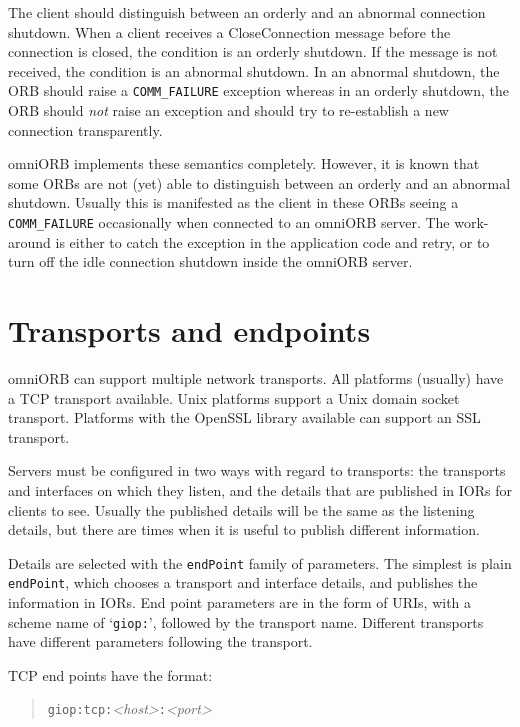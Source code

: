 \documentclass[draft,11pt,twoside,a4paper]{book}
\newcommand{\code}[1]{\texttt{#1}}
\begin{document}
The client should distinguish between an orderly and an abnormal
connection shutdown. When a client receives a CloseConnection message
before the connection is closed, the condition is an orderly shutdown.
If the message is not received, the condition is an abnormal shutdown.
In an abnormal shutdown, the ORB should raise a \code{COMM\_FAILURE}
exception whereas in an orderly shutdown, the ORB should \emph{not}
raise an exception and should try to re-establish a new connection
transparently.

omniORB implements these semantics completely. However, it is known
that some ORBs are not (yet) able to distinguish between an orderly
and an abnormal shutdown. Usually this is manifested as the client in
these ORBs seeing a \code{COMM\_FAILURE} occasionally when connected
to an omniORB server. The work-around is either to catch the exception
in the application code and retry, or to turn off the idle connection
shutdown inside the omniORB server.


\section{Transports and endpoints}

omniORB can support multiple network transports. All platforms
(usually) have a TCP transport available. Unix platforms support a
Unix domain socket transport. Platforms with the OpenSSL library
available can support an SSL transport.

Servers must be configured in two ways with regard to transports: the
transports and interfaces on which they listen, and the details that
are published in IORs for clients to see. Usually the published
details will be the same as the listening details, but there are times
when it is useful to publish different information.

Details are selected with the \code{endPoint} family of parameters.
The simplest is plain \code{endPoint}, which chooses a transport and
interface details, and publishes the information in IORs. End point
parameters are in the form of URIs, with a scheme name of
`\code{giop:}', followed by the transport name. Different transports
have different parameters following the transport.

TCP end points have the format:

\begin{quote}
\code{giop:tcp:}\textit{<host>}\code{:}\textit{<port>}
\end{quote}
\end{document}
